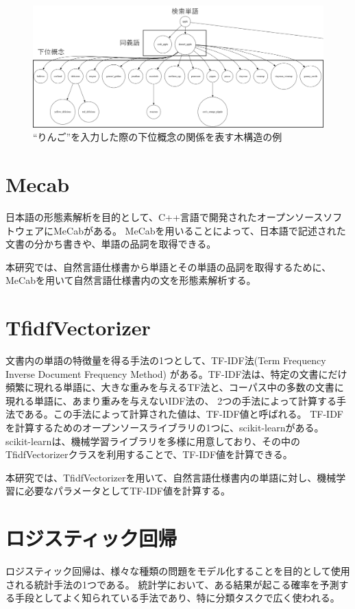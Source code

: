\begin{figure}[t]
    \begin{center}
        \includegraphics[width=1.0\columnwidth]{image/tree_structure.png}
        \caption{``りんご''を入力した際の下位概念の関係を表す木構造の例}
        \label{fig:tree_structure}
    \end{center}
\end{figure}

\section{Mecab}
\label{sec:mecab}
日本語の形態素解析を目的として、C++言語で開発されたオープンソースソフトウェアにMeCabがある\cite{mecab}。
MeCabを用いることによって、日本語で記述された文書の分かち書きや、単語の品詞を取得できる。

本研究では、自然言語仕様書から単語とその単語の品詞を取得するために、MeCabを用いて自然言語仕様書内の文を形態素解析する。

\section{TfidfVectorizer}
\label{sec:tfidf}
文書内の単語の特徴量を得る手法の1つとして、TF-IDF法(Term Frequency Inverse Document Frequency Method)
がある\cite{TF}。TF-IDF法は、特定の文書にだけ頻繁に現れる単語に、大きな重みを与えるTF法と、コーパス中の多数の文書に現れる単語に、あまり重みを与えないIDF法の、
2つの手法によって計算する手法である。この手法によって計算された値は、TF-IDF値と呼ばれる。
TF-IDFを計算するためのオープンソースライブラリの1つに、scikit-learnがある。
scikit-learnは、機械学習ライブラリを多様に用意しており、その中のTfidfVectorizerクラスを利用することで、TF-IDF値を計算できる\cite{cite6}。

本研究では、TfidfVectorizerを用いて、自然言語仕様書内の単語に対し、機械学習に必要なパラメータとしてTF-IDF値を計算する。

\section{ロジスティック回帰}
\label{sec:logistic}
ロジスティック回帰は、様々な種類の問題をモデル化することを目的として使用される統計手法の1つである。
統計学において、ある結果が起こる確率を予測する手段としてよく知られている手法であり、特に分類タスクで広く使われる。

